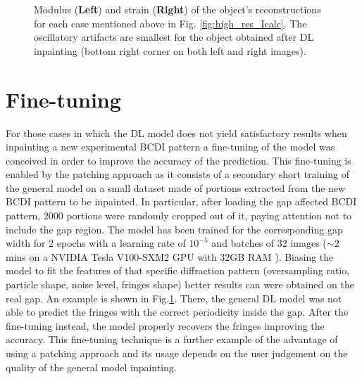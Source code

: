 \begin{figure}[H]
\begin{subfigure}{0.47\textwidth}
        \caption*{}
    \end{subfigure}
    \caption{Modulus (\textbf{Left}) and strain (\textbf{Right}) of the object's reconstructions for each case mentioned 
    above in Fig. \ref{fig:high_res_Icalc}. The oscillatory artifacts are smallest for the object obtained after DL 
    inpainting (bottom right corner on both left and right images).}
    \label{fig:high_res_obj}
\end{figure}

\section{Fine-tuning}\label{sec:finetuning}
For those cases in which the DL model does not yield satisfactory results when inpainting a new experimental BCDI pattern 
a fine-tuning of the model was conceived in order to improve the accuracy of the prediction. This fine-tuning is enabled by the 
patching approach as it consists of a secondary short training of the general model on a small dataset made of portions 
extracted from the new BCDI pattern to be inpainted.
In particular, after loading the gap affected BCDI pattern, 2000 portions were randomly cropped out of it, paying attention
not to include the gap region. The model has been trained for the corresponding gap width for 2 epochs with a learning 
rate of $ 10^{-5}$  and batches of 32 images ($\sim 2$ mins on a
NVIDIA Tesla V100-SXM2 GPU with 32GB RAM ). Biasing the
model to fit the features of that specific diffraction pattern (oversampling ratio, particle shape, noise level, fringes shape)
better results can were obtained on the real gap. An example is shown in Fig.\ref{sec:finetuning}. There, the general DL model
was not able to predict the fringes with the correct periodicity inside the gap. After the fine-tuning instead, the model 
properly recovers the fringes improving the accuracy. 
This fine-tuning technique is a further example of the advantage of using a patching approach and its usage depends
on the user judgement on the quality of the general model inpainting. 

